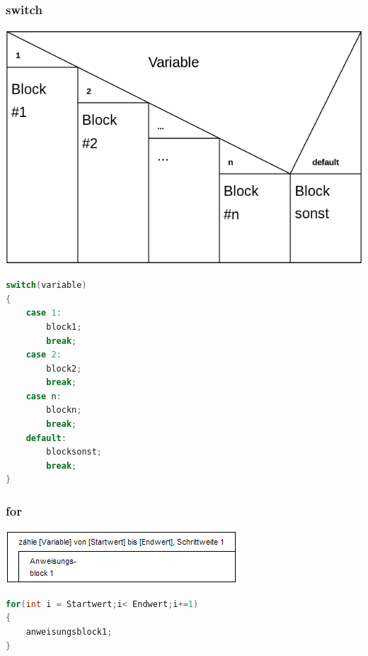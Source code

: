 \subsubsection{switch}

\noindent
\begin{minipage}{0.6\columnwidth} 
\includegraphics[width=1\columnwidth]{Pictures/Struktogramm_switch.png}
\end{minipage}
\begin{minipage}{0.4\columnwidth} 
\begin{lstlisting}[language = c]
switch(variable)
{
    case 1:
        block1;
        break;
    case 2:
        block2;
        break;
    case n:
        blockn;
        break;
    default:
        blocksonst;
        break;
}
\end{lstlisting}
\end{minipage}

\subsubsection{for}

\noindent
\begin{minipage}{0.6\columnwidth} 
\includegraphics[width=1\columnwidth]{Pictures/Struktogramm_for.png}
\end{minipage}
\begin{minipage}{0.4\columnwidth} 
\begin{lstlisting}[language = c]
for(int i = Startwert;i< Endwert;i+=1)
{
    anweisungsblock1;
}
\end{lstlisting}
\end{minipage}

